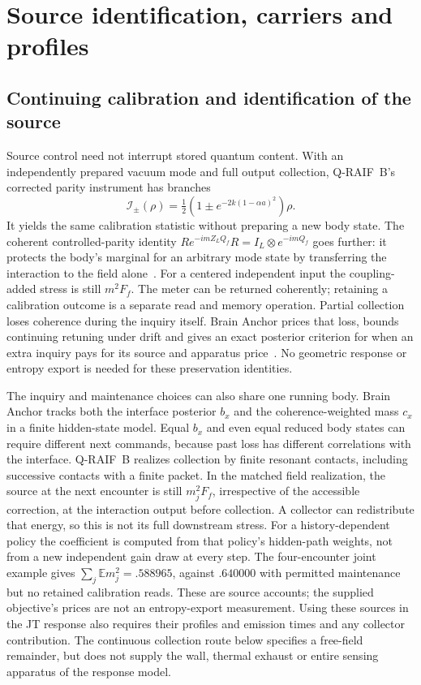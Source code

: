 \documentclass[12pt,a4paper]{article}
\begin{document}
\section{Source identification, carriers and profiles}
\label{app:source-details}

\subsection{Continuing calibration and identification of the source}
\label{sec:source-identification}

Source control need not interrupt stored quantum content. With an independently
prepared vacuum mode and full output collection, Q-RAIF~B's corrected parity
instrument has branches
\[
 \mathcal I_\pm(\rho)=\tfrac12(1\pm e^{-2k(1-\alpha a)^2})\rho.
\]
It yields the same calibration statistic without preparing a new body state.
The coherent controlled-parity identity
$R e^{-imZ_LQ_f}R=I_L\otimes e^{-imQ_f}$ goes further: it protects
the body's marginal for an arbitrary mode state by transferring the interaction
to the field alone~\cite{Liu2026QRAIFB}. For a centered independent input the
coupling-added stress is still $m^2F_f$. The meter can be returned coherently;
retaining a calibration outcome is a separate read and memory operation.
Partial collection loses coherence during the inquiry itself. Brain Anchor
prices that loss, bounds continuing retuning under drift and gives an exact
posterior criterion for when an extra inquiry pays for its source and apparatus
price~\cite{BrainAnchor}. No geometric response or entropy export is needed
for these preservation identities.

The inquiry and maintenance choices can also share one running body.
Brain Anchor tracks both the interface posterior $b_x$ and the
coherence-weighted mass $c_x$ in a finite hidden-state model. Equal $b_x$
and even equal reduced body states can require different next commands,
because past loss has different correlations with the interface.
Q-RAIF~B realizes collection by finite resonant contacts, including successive
contacts with a finite packet. In the matched field realization, the source
at the next encounter is still $m_j^2F_f$, irrespective of the accessible
correction, at the interaction output before collection. A collector can
redistribute that energy, so this is not its full downstream stress.
For a history-dependent policy the coefficient is computed
from that policy's hidden-path weights, not from a new independent gain draw
at every step. The four-encounter joint example gives
$\sum_j\mathbb E m_j^2=.588965$, against $.640000$ with permitted
maintenance but no retained calibration reads. These are source accounts;
the supplied objective's prices are not an entropy-export measurement.
Using these sources in the JT response also requires their profiles and
emission times and any collector contribution. The continuous collection
route below specifies a free-field remainder, but does not supply the wall,
thermal exhaust or entire sensing apparatus of the response model.
\end{document}
